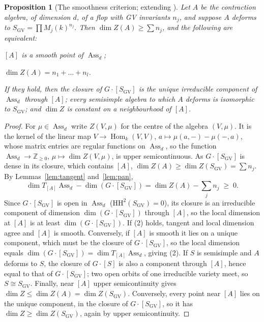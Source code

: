 \documentclass[11pt]{amsart}
\numberwithin{table}{section}
\numberwithin{figure}{section}
\numberwithin{equation}{section}
\newtheorem{prop}[thm]{Proposition}
\theoremstyle{definition}
\theoremstyle{plain}
\newcommand{\SGV}{S_{\mathrm{GV}}}
\newcommand{\HH}{\mathrm{HH}}
\newcommand{\Z}{\mathbb{Z}}
\DeclareMathOperator{\Hom}{Hom}
\DeclareMathOperator{\Ass}{Ass}
\begin{document}
\begin{prop}[{The smoothness criterion; extending \cite[Lemma~2.9, Prop~2.11]{Pan}}]\label{prop:criterion}
Let $A$ be the contraction algebra, of dimension $d$, of a flop with GV invariants $n_j$, and suppose $A$ deforms to $\SGV = \prod M_j(k)^{n_j}$. Then $\dim Z(A) \ge \sum n_j$, and the following are equivalent:
\begin{thmlist}
\item $[A]$ is a smooth point of $\Ass_d$;
\item $\dim Z(A) = n_1 + \dots + n_l$.
\end{thmlist}
If they hold, then the closure of $G\cdot[\SGV]$ is the unique irreducible component of $\Ass_d$ through $[A]$; every semisimple algebra to which $A$ deforms is isomorphic to $\SGV$; and $\dim Z$ is constant on a neighbourhood of $[A]$.
\end{prop}

\begin{proof}
For $\mu \in \Ass_d$ write $Z(V, \mu)$ for the centre of the algebra $(V, \mu)$. It is the kernel of the linear map $V \to \Hom_k(V, V)$, $a \mapsto \mu(a, -) - \mu(-, a)$, whose matrix entries are regular functions on $\Ass_d$, so the function $\Ass_d \to \Z_{\ge 0}$, $\mu \mapsto \dim Z(V, \mu)$, is upper semicontinuous. As $G\cdot[\SGV]$ is dense in its closure, which contains $[A]$, $\dim Z(A) \ge \dim Z(\SGV) = \sum n_j$. By Lemmas~\ref{lem:tangent} and~\ref{lem:pan},
\[
\dim T_{[A]}\Ass_d - \dim (G\cdot[\SGV]) = \dim Z(A) - \textstyle\sum_j n_j \;\ge\; 0.
\]
Since $G\cdot[\SGV]$ is open in $\Ass_d$ ($\HH^2(\SGV) = 0$), its closure is an irreducible component of dimension $\dim (G\cdot[\SGV])$ through $[A]$, so the local dimension at $[A]$ is at least $\dim (G\cdot[\SGV])$. If (2) holds, tangent and local dimension agree and $[A]$ is smooth. Conversely, if $[A]$ is smooth it lies on a unique component, which must be the closure of $G\cdot[\SGV]$, so the local dimension equals $\dim (G\cdot[\SGV]) = \dim T_{[A]}\Ass_d$, giving (2). If $S$ is semisimple and $A$ deforms to $S$, the closure of $G\cdot[S]$ is also a component through $[A]$, hence equal to that of $G\cdot[\SGV]$; two open orbits of one irreducible variety meet, so $S \cong \SGV$. Finally, near $[A]$ upper semicontinuity gives $\dim Z \le \dim Z(A) = \dim Z(\SGV)$. Conversely, every point near $[A]$ lies on the unique component, in the closure of $G\cdot[\SGV]$, so it has $\dim Z \ge \dim Z(\SGV)$, again by upper semicontinuity.
\end{proof}
\end{document}

